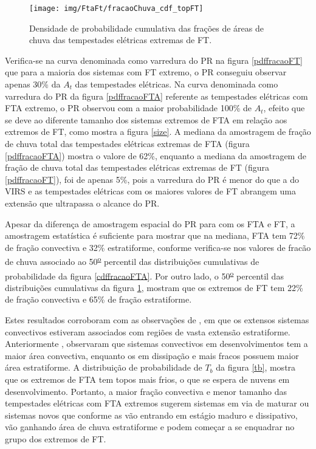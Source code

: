 \begin{figure}[!ht]
  \centering 
  \texttt{[image: img/FtaFt/fracaoChuva\_cdf\_topFT]}
  \caption{Densidade de probabilidade cumulativa das frações de áreas de chuva das tempestades elétricas extremas de FT.}
  \label{cdffracaoFT}
\end{figure}


Verifica-se na curva denominada como varredura do PR na figura \ref{pdffracaoFT} que para a maioria dos sistemas com FT extremo, o PR conseguiu observar apenas 30\% da $A_t$ das tempestades elétricas. Na curva denominada como varredura do PR da figura \ref{pdffracaoFTA} referente as tempestades elétricas com FTA extremo, o PR observou com a maior probabilidade 100\% de $A_t$, efeito que se deve ao diferente tamanho dos sistemas extremos de FTA em relação aos extremos de FT, como mostra a figura \ref{size}. A mediana da amostragem de fração de chuva total das tempestades elétricas extremas de FTA (figura \ref{pdffracaoFTA}) mostra o valore de 62\%, enquanto a mediana da amostragem de fração de chuva total das tempestades elétricas extremas de FT (figura \ref{pdffracaoFT}), foi de apenas 5\%, pois a varredura do PR é menor do que a do VIRS e as tempestades elétricas com os maiores valores de FT abrangem uma extensão que ultrapassa o alcance do PR. 

Apesar da diferença de amostragem espacial do PR para com os FTA e FT, a amostragem estatística é suficiente para mostrar que na mediana, FTA tem 72\% de fração convectiva e 32\% estratiforme, conforme verifica-se nos valores de fracão de chuva associado ao 50\textsuperscript{\underline{o}} percentil das distribuições cumulativas de probabilidade da figura \ref{cdffracaoFTA}. Por outro lado, o 50\textsuperscript{\underline{o}} percentil das distribuições cumulativas da figura \ref{cdffracaoFT}, mostram que os extremos de FT tem 22\% de fração convectiva e 65\% de fração estratiforme. 

Estes resultados corroboram com as observações de , em que os extensos sistemas convectivos estiveram associados com regiões de vasta extensão estratiforme. Anteriormente , observaram que sistemas convectivos em desenvolvimentos tem a maior área convectiva, enquanto os em dissipação e mais fracos possuem maior área estratiforme. A distribuição de probabilidade de $T_b$ da figura \ref{tb}, mostra que os extremos de FTA tem topos mais frios, o que se espera de nuvens em desenvolvimento. Portanto, a maior fração convectiva e menor tamanho das tempestades elétricas com FTA extremos sugerem sistemas em via de maturar ou sistemas novos que conforme as vão entrando em estágio maduro e dissipativo, vão ganhando área de chuva estratiforme e podem começar a se enquadrar no grupo dos extremos de FT. 

